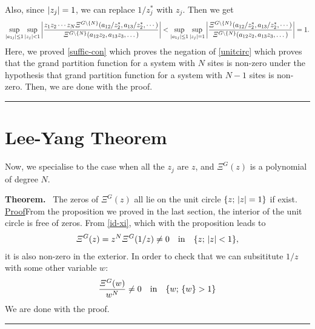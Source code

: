 \documentclass[aps, 12pt]{revtex4-2}
\begin{document}
Also, since $\qty|z_j| = 1$, we can replace $1/z_j^*$ with $z_j$. Then we get
\begin{align}
  \sup_{\qty|a_{1j}| \leq 1} \sup_{\qty|z_j| < 1} \qty|\frac{z_1z_2 \cdots z_N\varXi^{G\backslash \qty{N}}(a_{12}/z_{2}^*, a_{13}/z_2^*, \cdots)}{\varXi^{G\backslash \qty{N}}(a_{12}z_2, a_{13}z_3, \dots)}| < \sup_{\qty|a_{1j}| \leq 1} \sup_{\qty|z_j| = 1} \qty|\frac{\varXi^{G\backslash \qty{N}}(a_{12}/z_{2}^*, a_{13}/z_2^*, \cdots)}{\varXi^{G\backslash \qty{N}}(a_{12}z_2, a_{13}z_3, \dots)}| = 1.
\end{align}
Here, we proved \eqref{suffic-con} which proves the negation of \eqref{unitcirc} which proves that the grand partition function for a system with $N$ sites is non-zero under the hypothesis that grand partition function for a system with $N-1$ sites is non-zero. Then, we are done with the proof. \hfill \rule{1.5mm}{3.5mm}
\section{Lee-Yang Theorem}
Now, we specialise to the case when all the $z_j$ are $z$, and $\varXi^{G}(z)$ is a polynomial of degree $N$.

\noindent
\textbf{Theorem.} \, The zeros of $\varXi^G(z)$ all lie on the unit circle $\qty{z; \,\qty|z| = 1}$ if exist. \\
\underline{Proof}\quad From the proposition we proved in the last section, the interior of the unit circle is free of zeros. From \eqref{id-xi}, which with the proposition leads to
\begin{align} 
  \varXi^{G}(z) = z^N \varXi^{G}(1/z) \ne 0 \quad \text{in} \quad \qty{z;\, \qty|z| < 1},
\end{align}
it is also non-zero in the exterior. In order to check that we can subsititute $1/z$ with some other variable $w$:
\begin{dmath}
  \frac{\varXi^G(w)}{w^N} \ne 0 \quad \text{in} \quad \qty{w; \, \qty{w} > 1}
\end{dmath}
We are done with the proof. \hfill \rule{1.5mm}{3.5mm}
\end{document}

